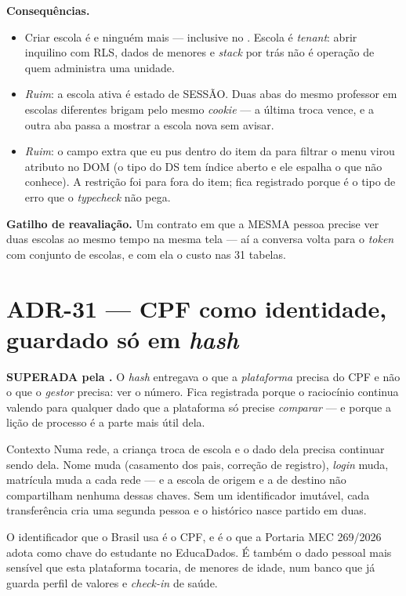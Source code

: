 \textbf{Consequências.}
\begin{itemize}
  \item Criar escola é  e ninguém mais --- inclusive no
    . Escola é \emph{tenant}: abrir inquilino com RLS, dados de
    menores e \emph{stack} por trás não é operação de quem administra uma unidade.
  \item \emph{Ruim}: a escola ativa é estado de SESSÃO. Duas abas do mesmo
    professor em escolas diferentes brigam pelo mesmo \emph{cookie} --- a última
    troca vence, e a outra aba passa a mostrar a escola nova sem avisar.
  \item \emph{Ruim}: o campo extra que eu pus dentro do item da  para
    filtrar o menu virou atributo no DOM (o tipo do DS tem índice aberto e ele
    espalha o que não conhece). A restrição foi para fora do item; fica
    registrado porque é o tipo de erro que o \emph{typecheck} não pega.
\end{itemize}

\textbf{Gatilho de reavaliação.} Um contrato em que a MESMA pessoa precise ver
duas escolas ao mesmo tempo na mesma tela --- aí a conversa volta para o
\emph{token} com conjunto de escolas, e com ela o custo nas 31 tabelas.

\section{ADR-31 --- CPF como identidade, guardado só em \emph{hash}}
\label{adr:cpf}

\begin{atencao}
\textbf{SUPERADA pela .} O \emph{hash} entregava o que a
\emph{plataforma} precisa do CPF e não o que o \emph{gestor} precisa: ver o
número. Fica registrada porque o raciocínio continua valendo para qualquer dado
que a plataforma só precise \emph{comparar} --- e porque a lição de processo é a
parte mais útil dela.
\end{atencao}

\begin{especificacao}{Contexto}
Numa rede, a criança troca de escola e o dado dela precisa continuar sendo dela.
Nome muda (casamento dos pais, correção de registro), \emph{login} muda,
matrícula muda a cada rede --- e a escola de origem e a de destino não
compartilham nenhuma dessas chaves. Sem um identificador imutável, cada
transferência cria uma segunda pessoa e o histórico nasce partido em duas.

O identificador que o Brasil usa é o CPF, e é o que a Portaria MEC 269/2026
adota como chave do estudante no EducaDados. É também o dado pessoal mais
sensível que esta plataforma tocaria, de menores de idade, num banco que já
guarda perfil de valores e \emph{check-in} de saúde.
\end{especificacao}


